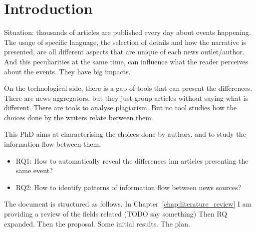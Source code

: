\chapter{Introduction}


Situation: thousands of articles are published every day about events happening.
The usage of specific language, the selection of details and how the narrative is presented, are all different aspects that are unique of each news outlet/author.
And this peculiarities at the same time, can influence what the reader perceives about the events. They have big impacts.


On the technological side, there is a gap of tools that can present the differences.
There are news aggregators, but they just group articles without saying what is different. There are tools to analyse plagiarism.
But no tool studies how the choices done by the writers relate between them.


This PhD aims at characterising the choices done by authors, and to study the information flow between them.

\begin{itemize}
    \item RQ1: How to automatically reveal the differences inn articles presenting the same event?
    \item RQ2: How to identify patterns of information flow between news sources?
\end{itemize}








The document is structured as follows.
In Chapter~\ref{chap:literature_review} I am providing a review of the fields related (TODO say something)
Then RQ expanded.
Then the proposal.
Some initial results.
The plan.


